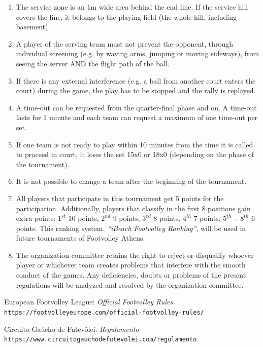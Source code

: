 \documentclass[a4paper,11pt]{article}
\begin{document}
\begin{enumerate}
\item The service zone is an 1m wide area behind the end line. If the service
  hill covers the line, it belongs to the playing field (the whole hill,
  including basement).

\item A player of the serving team must not prevent the opponent, through
  individual screening (e.g. by waving arms, jumping or moving sideways), from
  seeing the server AND the flight path of the ball.

\item If there is any external interference (e.g. a ball from another court
  enters the court) during the game, the play has to be stopped and the rally is
  replayed.

\item A time-out can be requested from the quarter-final phase and on. A
  time-out lasts for 1 minute and each team can request a maximum of one
  time-out per set.

\item If one team is not ready to play within 10 minutes from the time it is
  called to proceed in court, it loses the set 15x0 or 18x0 (depending on the
  phase of the tournament).

\item It is not possible to change a team after the beginning of the tournament.

\item All players that participate in this tournament get 5 points for the
  participation. Additionally, players that classify in the first 8 positions
  gain extra points: $1^{st}$ 10 points, $2^{nd}$ 9 points, $3^{rd}$ 8 points,
  $4^{th}$ 7 points, $5^{th}-8^{th}$ 6 points. This ranking system,
  \textit{``iBeach Footvolley Ranking''}, will be used in future tournaments of
  Footvolley Athens.

\item The organization committee retains the right to reject or disqualify
  whoever player or whichever team creates problems that interfere with the
  smooth conduct of the games. Any deficiencies, doubts or problems of the
  present regulations will be analyzed and resolved by the organization
  committee.

\end{enumerate}

\renewcommand{\refname}{}

\begin{thebibliography}{1}

  European Footvolley League:
  \textit{Official Footvolley Rules}
  \\\texttt{https://footvolleyeurope.com/official-footvolley-rules/}

  Circuito Gaúcho de Futevôlei:
  \textit{Regulamento}
  \\\texttt{https://www.circuitogauchodefutevolei.com/regulamento}
\end{thebibliography}
\end{document}
